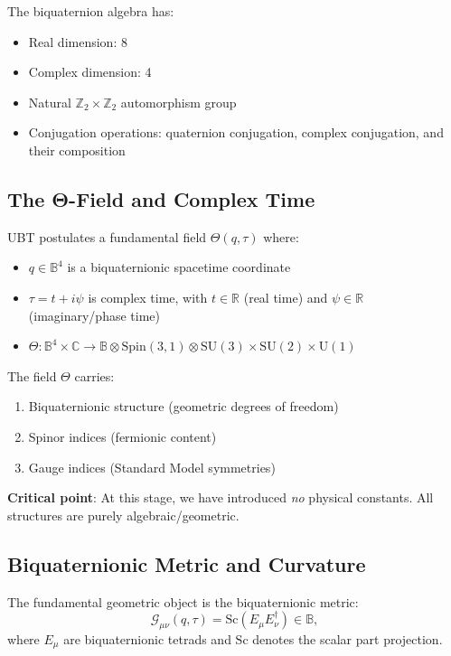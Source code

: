 \documentclass[12pt]{article}
\begin{document}
The biquaternion algebra has:
\begin{itemize}
\item Real dimension: 8
\item Complex dimension: 4
\item Natural $\mathbb{Z}_2 \times \mathbb{Z}_2$ automorphism group
\item Conjugation operations: quaternion conjugation, complex conjugation, and their composition
\end{itemize}

\subsection{The Θ-Field and Complex Time}

UBT postulates a fundamental field $\Theta(q, \tau)$ where:
\begin{itemize}
\item $q \in \mathbb{B}^4$ is a biquaternionic spacetime coordinate
\item $\tau = t + i\psi$ is complex time, with $t \in \mathbb{R}$ (real time) and $\psi \in \mathbb{R}$ (imaginary/phase time)
\item $\Theta: \mathbb{B}^4 \times \mathbb{C} \to \mathbb{B} \otimes \text{Spin}(3,1) \otimes \text{SU}(3) \times \text{SU}(2) \times \text{U}(1)$
\end{itemize}

The field $\Theta$ carries:
\begin{enumerate}
\item Biquaternionic structure (geometric degrees of freedom)
\item Spinor indices (fermionic content)
\item Gauge indices (Standard Model symmetries)
\end{enumerate}

\textbf{Critical point}: At this stage, we have introduced \emph{no} physical constants. All structures are purely algebraic/geometric.

\subsection{Biquaternionic Metric and Curvature}

The fundamental geometric object is the biquaternionic metric:
\[
\mathcal{G}_{\mu\nu}(q, \tau) = \text{Sc}(E_\mu E_\nu^\dagger) \in \mathbb{B},
\]
where $E_\mu$ are biquaternionic tetrads and $\text{Sc}$ denotes the scalar part projection.
\end{document}

